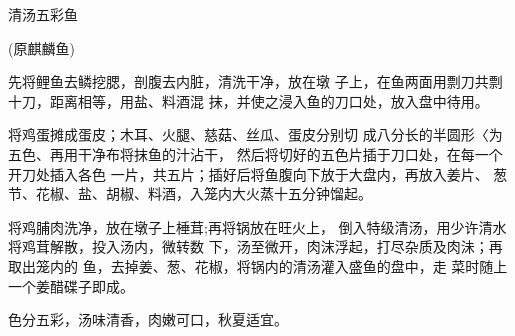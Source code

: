 \begin{recipe}{清汤五彩鱼}

(原麒麟鱼)

\ingredients


\cooking

\step 	先将鲤鱼去鳞挖腮，剖腹去内脏，清洗干净，放在墩 子上，在鱼两面用剽刀共剽十刀，距离相等，用盐、料酒混 抹，并使之浸入鱼的刀口处，放入盘中待用。

\step 	将鸡蛋摊成蛋皮；木耳、火腿、慈菇、丝瓜、蛋皮分别切 成八分长的半圆形〈为五色、再用干净布将抹鱼的汁沾干， 然后将切好的五色片插于刀口处，在每一个开刀处插入各色 一片，共五片；插好后将鱼腹向下放于大盘内，再放入姜片、 葱节、花椒、盐、胡椒、料酒，入笼内大火蒸十五分钟馏起。

将鸡脯肉洗净，放在墩子上棰茸;再将锅放在旺火上， 倒入特级清汤，用少许清水将鸡茸解散，投入汤内，微转数 下，汤至微开，肉沫浮起，打尽杂质及肉沬；再取出笼内的 鱼，去掉姜、葱、花椒，将锅内的清汤灌入盛鱼的盘中，走 菜时随上一个姜醋碟子即成。

\notes

色分五彩，汤味清香，肉嫩可口，秋夏适宜。

\end{recipe}

